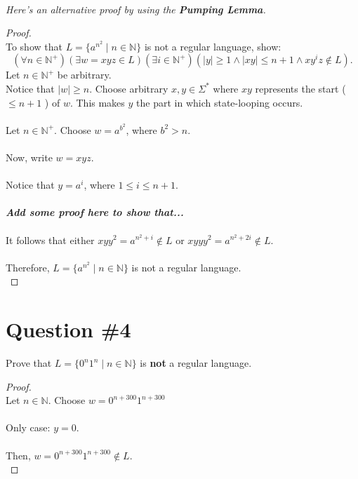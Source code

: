 \documentclass[12pt]{article}
\begin{document}
\leavevmode\\
\textit{Here's an alternative proof by using the \textbf{Pumping Lemma}.}
\begin{proof}
\leavevmode\\
    To show that \( L = \{ a^{n^2} \mid n \in \mathbb{N} \} \) is not a regular language, show:
    \[
        (\forall n \in \mathbb{N}^+)(\exists w = xyz \in L)(\exists i \in \mathbb{N}^+)(|y| \geq 1 \land |xy| \leq n + 1 \land xy^iz \notin L) \text{.}
    \]
    Let \( n \in \mathbb{N}^+ \) be arbitrary. \\
    Notice that \( |w| \geq n \). Choose arbitrary \( x, y \in \Sigma^* \) where \( xy \) represents the start (\( \leq n + 1 \) ) of \( w \). This makes \( y \) the part in which state-looping occurs. \\
    \\
    Let \( n \in \mathbb{N}^+ \). Choose \( w = a^{b^2} \), where \( b^2 > n \). \\
    \\
    Now, write \( w = xyz \). \\
    \\
    Notice that \( y = a^i \), where \( 1 \leq  i \leq  n + 1 \). \\
    \\
    \textbf{\textit{Add some proof here to show that...}} \\
    \\
    It follows that either \( xyy^2 = a^{n^2 + i} \notin L \) or \( xyyy^2 = a^{n^2 + 2i} \notin L \). \\
    \\
    Therefore, \( L = \{ a^{n^2} \mid n \in \mathbb{N} \} \) is not a regular language. \\
\end{proof}
\pagebreak

\section*{Question \#4}
Prove that \( L = \{ 0^n1^n \mid n \in \mathbb{N} \} \) is \textbf{not} a regular language.\begin{proof}
\leavevmode\\
    Let \( n \in \mathbb{N} \). Choose \( w = 0^{n + 300}1^{n + 300} \) \\
    \\
    Only case: \( y = 0 \). \\
    \\
    Then, \( w = 0^{n + 300}1^{n + 300} \notin L \). \\
\end{proof}
\pagebreak
\end{document}

